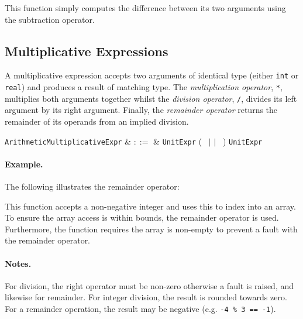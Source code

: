 

This function simply computes the difference between its two arguments using the subtraction operator.


\subsection{Multiplicative Expressions}
\label{c_expr_multiplicative}

A multiplicative expression accepts two arguments of identical type (either \lstinline{int} or \lstinline{real}) and produces a result of matching type.  The {\em multiplication operator}, \lstinline{*}, multiplies both arguments together whilst the {\em division operator}, \lstinline{/}, divides its left argument by its right argument.  Finally, the {\em remainder operator} returns the remainder of its operands from an implied division.  

\begin{syntax}
  \verb+ArithmeticMultiplicativeExpr+ & $::=$ & \verb+UnitExpr+ \big(\ \token{*} $|$ \token{/} $|$ \token{\%}\ \big) \verb+UnitExpr+\\
\end{syntax}

\paragraph{Example.} The following illustrates the remainder operator:



This function accepts a non-negative integer and uses this to index into an array.  To ensure the array access is within bounds, the remainder operator is used.  Furthermore, the function requires the array is non-empty to prevent a fault with the remainder operator.

\paragraph{Notes.}  For division, the right operator must be non-zero otherwise a \gls{fault} is raised, and likewise for remainder.  For integer division, the result is rounded towards zero.  For a remainder operation, the result may be negative (e.g. \lstinline{-4 % 3 == -1}).


